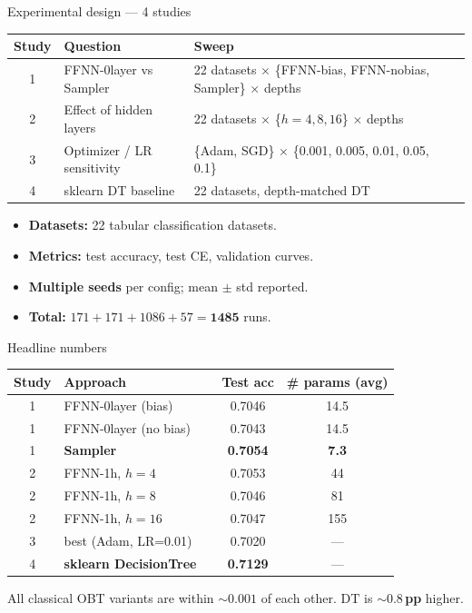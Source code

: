 \documentclass[aspectratio=169,10pt]{beamer}
\newcommand{\good}[1]{\textcolor{good}{\textbf{#1}}}
\begin{document}
\begin{frame}{Experimental design --- 4 studies}
  \centering
  \begin{tabular}{@{}clll@{}}
    \toprule
    \textbf{Study} & \textbf{Question}                  & \textbf{Sweep} \\
    \midrule
    1 & FFNN-0layer vs Sampler   & 22 datasets $\times$ \{FFNN-bias, FFNN-nobias, Sampler\} $\times$ depths \\
    2 & Effect of hidden layers  & 22 datasets $\times$ \{$h=4, 8, 16$\} $\times$ depths                    \\
    3 & Optimizer / LR sensitivity & \{Adam, SGD\} $\times$ \{0.001, 0.005, 0.01, 0.05, 0.1\}              \\
    4 & sklearn DT baseline      & 22 datasets, depth-matched DT                                            \\
    \bottomrule
  \end{tabular}

  \bigskip
  \begin{itemize}
    \item \textbf{Datasets:} 22 tabular classification datasets.
    \item \textbf{Metrics:} test accuracy, test CE, validation curves.
    \item \textbf{Multiple seeds} per config; mean $\pm$ std reported.
    \item \textbf{Total:} $171 + 171 + 1086 + 57 = \mathbf{1485}$ runs.
  \end{itemize}
\end{frame}

\begin{frame}{Headline numbers}
  \centering
  \begin{tabular}{@{}cllcc@{}}
    \toprule
    \textbf{Study} & \textbf{Approach} & & \textbf{Test acc} & \textbf{\# params (avg)} \\
    \midrule
    1 & FFNN-0layer (bias)        & & 0.7046          & 14.5         \\
    1 & FFNN-0layer (no bias)     & & 0.7043          & 14.5         \\
    1 & \textbf{Sampler}          & & \good{0.7054}   & \good{7.3}   \\
    2 & FFNN-1h, $h=4$            & & 0.7053          & 44           \\
    2 & FFNN-1h, $h=8$            & & 0.7046          & 81           \\
    2 & FFNN-1h, $h=16$           & & 0.7047          & 155          \\
    3 & best (Adam, LR=0.01)      & & 0.7020          & ---          \\
    4 & \textbf{sklearn DecisionTree} & & \good{0.7129} & ---        \\
    \bottomrule
  \end{tabular}

  \bigskip
  All classical OBT variants are within \textbf{$\sim 0.001$} of each other.
  DT is \textbf{$\sim 0.8$\,pp} higher.
\end{frame}
\end{document}

